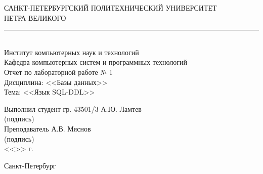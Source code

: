\begin{titlepage}
\begin{center}
	САНКТ-ПЕТЕРБУРГСКИЙ ПОЛИТЕХНИЧЕСКИЙ УНИВЕРСИТЕТ\\ ПЕТРА ВЕЛИКОГО\\[0.3cm]
	\par\noindent\rule{10cm}{0.4pt}\\[0.3cm]
	Институт компьютерных наук и технологий \\[0.3cm]
	Кафедра компьютерных систем и программных технологий\\[4cm]
	
	Отчет по лабораторной работе № 1\\[3mm]
	Дисциплина: <<Базы данных>>\\[3mm]
	Тема: <<Язык SQL-DDL>>\\[7cm]
\end{center}

\begin{flushleft}
	\hspace*{5mm} Выполнил студент гр. 43501/3  \hspace*{2.5cm}\sign[3cm]\hspace*{3.0mm} А.Ю. Ламтев\\
	\hspace*{10.4cm} (подпись)\\[3mm]
	\hspace*{5mm} Преподаватель \hspace*{6.0cm}\sign[3cm]\hspace*{2mm} А.В. Мяснов\\
	\hspace*{10.4cm} (подпись)\\[3mm]
	\hspace*{11.1cm} <<\sign[7mm]>> \sign[27mm] \the\year\hspace{1mm} г.
\end{flushleft}

\vfill

\begin{center}
	Санкт-Петербург\\
	\the\year
\end{center}
\end{titlepage}
\addtocounter{page}{1}